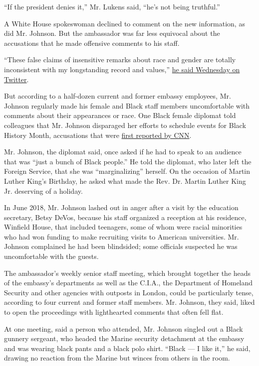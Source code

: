``If the president denies it,'' Mr. Lukens said, ``he's not being
truthful.''

A White House spokeswoman declined to comment on the new information, as
did Mr. Johnson. But the ambassador was far less equivocal about the
accusations that he made offensive comments to his staff.

``These false claims of insensitive remarks about race and gender are
totally inconsistent with my longstanding record and values,''
\href{https://twitter.com/USAmbUK/status/1286029006500966402?s=20}{he
said Wednesday on Twitter}.

But according to a half-dozen current and former embassy employees, Mr.
Johnson regularly made his female and Black staff members uncomfortable
with comments about their appearances or race. One Black female diplomat
told colleagues that Mr. Johnson disparaged her efforts to schedule
events for Black History Month, accusations that were
\href{https://www.cnn.com/2020/07/22/politics/woody-johnson-oig-report/index.html}{first
reported by CNN}.

Mr. Johnson, the diplomat said, once asked if he had to speak to an
audience that was ``just a bunch of Black people.'' He told the
diplomat, who later left the Foreign Service, that she was
``marginalizing'' herself. On the occasion of Martin Luther King's
Birthday, he asked what made the Rev. Dr. Martin Luther King Jr.
deserving of a holiday.

In June 2018, Mr. Johnson lashed out in anger after a visit by the
education secretary, Betsy DeVos, because his staff organized a
reception at his residence, Winfield House, that included teenagers,
some of whom were racial minorities who had won funding to make
recruiting visits to American universities. Mr. Johnson complained he
had been blindsided; some officials suspected he was uncomfortable with
the guests.

The ambassador's weekly senior staff meeting, which brought together the
heads of the embassy's departments as well as the C.I.A., the Department
of Homeland Security and other agencies with outposts in London, could
be particularly tense, according to four current and former staff
members. Mr. Johnson, they said, liked to open the proceedings with
lighthearted comments that often fell flat.

At one meeting, said a person who attended, Mr. Johnson singled out a
Black gunnery sergeant, who headed the Marine security detachment at the
embassy and was wearing black pants and a black polo shirt. ``Black ---
I like it,'' he said, drawing no reaction from the Marine but winces
from others in the room.

